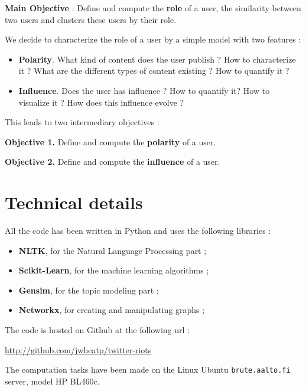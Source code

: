 \documentclass[a4paper,twoside,12pt,openright]{report}
\begin{document}
\begin{objbox}\color{Maroon}
\textbf{Main Objective} : Define and compute the \textbf{role} of a user, the similarity between two users and clusters these users by their role.
\end{objbox}

We decide to characterize the role of a user by a simple model with two features :
\begin{itemize}
\item \textbf{Polarity}. What kind of content does the user publish ? How to characterize it ? What are the different types of content existing ? How to quantify it ?
\item \textbf{Influence}. Does the user has influence ? How to quantify it? How to visualize it ? How does this influence evolve ?
\end{itemize}
This leads to two intermediary objectives : 
\begin{objbox}\color{Maroon}
\textbf{Objective 1.} Define and compute the \textbf{polarity} of a user.
\end{objbox}

\begin{objbox}\color{Maroon}
\textbf{Objective 2.} Define and compute the \textbf{influence} of a user.
\end{objbox}

\newpage

\section{Technical details}
All the code has been written in Python and uses the following libraries : 
\begin{itemize}
\item \textbf{NLTK}, for the Natural Language Processing part ;
\item \textbf{Scikit-Learn}, for the machine learning algorithms ;
\item \textbf{Gensim}, for the topic modeling part ;
\item \textbf{Networkx}, for creating and manipulating graphs ;
\end{itemize}

The code is hosted on Github at the following url :
\begin{center}
\vspace{0cm}
\url{http://github.com/jwheatp/twitter-riots}
\end{center}

The computation tasks have been made on the Linux Ubuntu \texttt{brute.aalto.fi} server, model HP BL460c.
\end{document}
